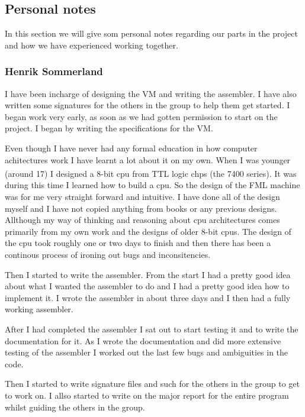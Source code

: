 \documentclass{article}
\begin{document}
\subsection{Personal notes}
In this section we will give som personal notes regarding our parts in the
project and how we have experienced working together.
\subsubsection{Henrik Sommerland}
I have been incharge of designing the VM and writing the assembler. I have also
written some signatures for the others in the group to help them get started. I
began work very early, as soon as we had gotten permission to start on the
project. I  began by writing the specifications for the VM.

Even though I have never had any formal education in how computer achitectures
work I have learnt a lot about it on my own. When I was younger (around 17) I
designed a 8-bit cpu from TTL logic chps (the 7400
series\textsuperscript{\cite{7400}}). It was during this time I learned how to
build a cpu. So the design of the FML machine was for me very straight forward
and intuitive.
I have done all of the design myself and I have not
copied anything from books or any previous designs. Allthough my way of thinking
and reasoning about cpu architectures comes primarily from my own work and the
designs of older 8-bit cpus. The design of the cpu took roughly one or two days
to finish and then there has been a continous process of ironing out bugs and
inconsitencies.

Then I started to write the assembler. From the start I had a pretty good idea
about what I wanted the assembler to do and I had a pretty good idea how to
implement it. I wrote the assembler in about three days and I then had a fully
working assembler.

After I had completed the assembler I sat out to start testing it and to write
the documentation for it. As I wrote the documentation and did more extensive
testing of the assembler I worked out the last few bugs and ambiguities in the
code.

Then I started to write signature files and such for the others in the group to
get to work on. I allso started to write on the major report for the entire
program whilst guiding the others in the group.
\end{document}
